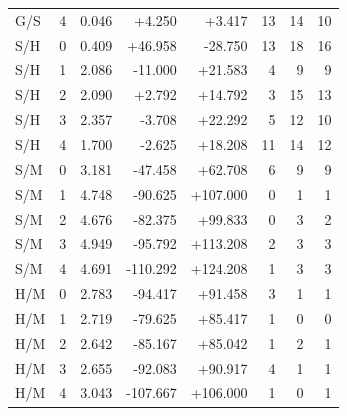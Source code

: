 \documentclass[preprint,12pt]{elsarticle}
\begin{document}
{\begin{longtable}{llrrrrrr}
G/S & 4 & 0.046 & +4.250 & +3.417 & 13 & 14 & 10 \\
\addlinespace
S/H & 0 & 0.409 & +46.958 & -28.750 & 13 & 18 & 16 \\
S/H & 1 & 2.086 & -11.000 & +21.583 & 4 & 9 & 9 \\
S/H & 2 & 2.090 & +2.792 & +14.792 & 3 & 15 & 13 \\
S/H & 3 & 2.357 & -3.708 & +22.292 & 5 & 12 & 10 \\
S/H & 4 & 1.700 & -2.625 & +18.208 & 11 & 14 & 12 \\
\addlinespace
S/M & 0 & 3.181 & -47.458 & +62.708 & 6 & 9 & 9 \\
S/M & 1 & 4.748 & -90.625 & +107.000 & 0 & 1 & 1 \\
S/M & 2 & 4.676 & -82.375 & +99.833 & 0 & 3 & 2 \\
S/M & 3 & 4.949 & -95.792 & +113.208 & 2 & 3 & 3 \\
S/M & 4 & 4.691 & -110.292 & +124.208 & 1 & 3 & 3 \\
\addlinespace
H/M & 0 & 2.783 & -94.417 & +91.458 & 3 & 1 & 1 \\
H/M & 1 & 2.719 & -79.625 & +85.417 & 1 & 0 & 0 \\
H/M & 2 & 2.642 & -85.167 & +85.042 & 1 & 2 & 1 \\
H/M & 3 & 2.655 & -92.083 & +90.917 & 4 & 1 & 1 \\
H/M & 4 & 3.043 & -107.667 & +106.000 & 1 & 0 & 1 \\
\end{longtable}
}
\end{document}
